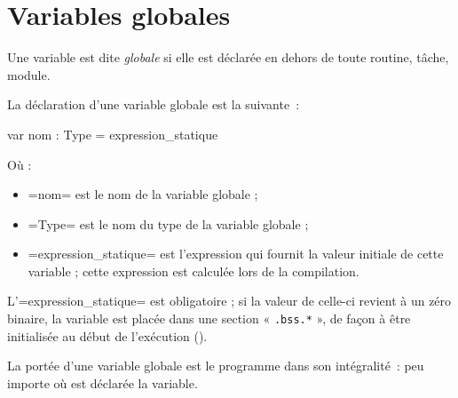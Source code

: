 




\chapter{Variables globales}

Une variable est dite \emph{globale} si elle est déclarée en dehors de toute routine, tâche, module.


%





La déclaration d'une variable globale est la suivante~:

\begin{PLM}
var nom : Type = expression_statique
\end{PLM}

Où :
\begin{itemize}
  \item \plm=nom= est le nom de la variable globale ;
  \item \plm=Type= est le nom du type de la variable globale ;
  \item \plm=expression_statique= est l'expression qui fournit la valeur initiale de cette variable ; cette expression est calculée lors de la compilation.
\end{itemize}

L'\plm=expression_statique= est obligatoire ; si la valeur de celle-ci revient à un zéro binaire, la variable est placée dans une section « \texttt{.bss.*} », de façon à être initialisée au début de l'exécution ().

La portée d'une variable globale est le programme dans son intégralité~: peu importe où est déclarée la variable.

